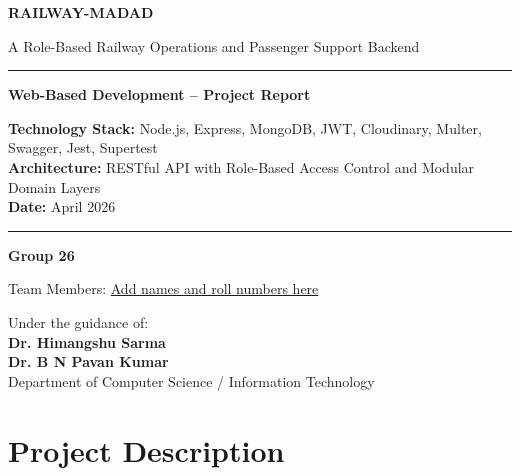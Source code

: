 \documentclass[12pt,a4paper]{report}
\begin{document}
\begin{titlepage}
    \centering
    \vspace*{1.5cm}

  {\color{Primary}\bfseries\Huge RAILWAY-MADAD \par}
    \vspace{0.5cm}
    {\Large A Role-Based Railway Operations and Passenger Support Backend\par}

    \vspace{1.2cm}
    \textcolor{Primary}{\rule{0.65\textwidth}{1.2pt}}
    \vspace{0.5cm}

    {\large\textbf{Web-Based Development -- Project Report} \par}

    \vspace{0.6cm}
    {\normalsize
    \textbf{Technology Stack:} Node.js, Express, MongoDB, JWT, Cloudinary, Multer, Swagger, Jest, Supertest \\
    \textbf{Architecture:} RESTful API with Role-Based Access Control and Modular Domain Layers \\
    \textbf{Date:} April 2026
    \par}

    \vspace{0.5cm}
    \textcolor{Primary}{\rule{0.65\textwidth}{1.2pt}}

    \vspace{1.2cm}
    {\Large\textbf{Group 26}\par}

    \vspace{0.4cm}
    {\normalsize
    Team Members: \underline{Add names and roll numbers here}
    \par}

    \vfill
    {\normalsize
    Under the guidance of:\\
    \textbf{Dr. Himangshu Sarma}\\
    \textbf{Dr. B N Pavan Kumar}\\
    Department of Computer Science / Information Technology
    \par}
\end{titlepage}

\tableofcontents
\newpage

\chapter{Project Description}
\end{document}
